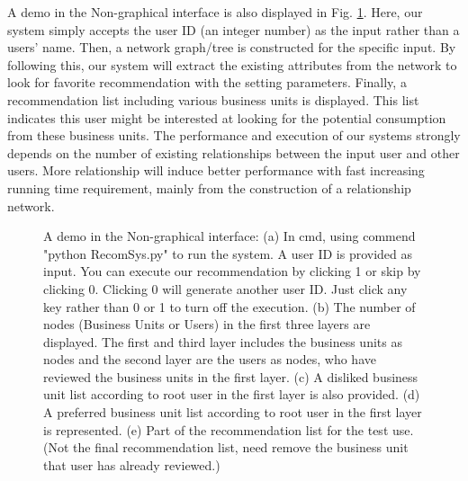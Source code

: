 \begin{itemize}
A demo in the Non-graphical interface is also displayed in Fig. \ref{fig:demo_pipeline}. Here, our system simply accepts the user ID (an integer number) as the input rather than a users' name. Then, a network graph/tree is constructed for the specific input. By following this, our system will extract the existing attributes from the network to look for favorite recommendation with the setting parameters. Finally, a recommendation list including various business units is displayed. This list indicates this user might be interested at looking for the potential consumption from these business units. The performance and execution of our systems strongly depends on the number of existing relationships between the input user and other users. More relationship will induce better performance with fast increasing running time requirement, mainly from the construction of a relationship network.\\ 

\begin{figure}[h] 
	\begin{center}
		\advance\rightskip-1cm
		{}
		\caption{A demo in the Non-graphical interface: (a) In cmd, using commend "python RecomSys.py" to run the system. A user ID is provided as input. You can execute our recommendation by clicking 1 or skip by clicking 0. Clicking 0 will generate another user ID. Just click any key rather than 0 or 1 to turn off the execution.  (b) The number of nodes (Business Units or Users) in the first three layers are displayed. The first and third layer includes the business units as nodes and the second layer are the users as nodes, who have reviewed the business units in the first layer. (c) A disliked business unit list according to root user in the first layer is also provided. (d) A preferred business unit list according to root user in the first layer is represented. (e) Part of the recommendation list for the test use.(Not the final recommendation list, need remove the business unit that user has already reviewed.)}\label{fig:demo_pipeline}
	\end{center}
\end{figure}


\end{itemize}
